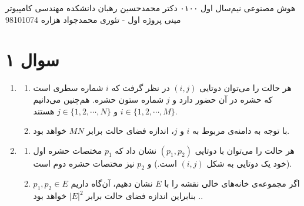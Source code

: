 \documentclass[a4paper, 12pt]{article}
\begin{document}
\handout
{هوش مصنوعی}
{نیم‌سال اول ۰۱\lr{-}۰۰}
{دکتر محمدحسین رهبان}
{دانشکده مهندسی کامپیوتر}
{مینی پروژه اول - تئوری}
{محمدجواد هزاره}
{98101074}
\noindent
\\[-6em]
\section*{سوال ۱}
\begin{enumerate}[آ)]
	\item\begin{enumerate}[.i]
		\item
		هر حالت را می‌توان دوتایی $(i,j)$ در نظر گرفت که $i$ شماره سطری است که حشره در آن حضور دارد و $j$ شماره ستون حشره. هم‌چنین می‌دانیم 
		$i \in \{1, 2, \cdots, M\}$
		و
		$j \in \{1,2,\cdots, N\}$
		هستند.
		\item
		با توجه به دامنه‌ی مربوط به $i$ و $j$، اندازه فضای حالت برابر $MN$ خواهد بود.
	\end{enumerate}
	\item\begin{enumerate}[.i]
		\item
		هر حالت را می‌توان با دوتایی $(p_1, p_2)$ نشان داد که $p_1$ مختصات حشره اول (خود یک دوتایی به شکل $(i,j)$ است.) و $p_2$ نیز مختصات حشره دوم است.
		\item
		اگر مجموعه‌ی خانه‌های خالی نقشه را با $E$ نشان دهیم، آن‌گاه داریم
		$p_1, p_2 \in E$.
		بنابراین اندازه فضای حالت برابر
		$|E|^2$
		خواهد بود.
	\end{enumerate}
\end{enumerate}
\end{document}
